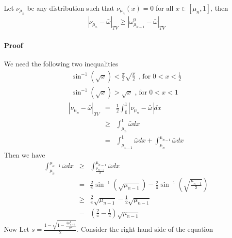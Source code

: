 \begin{lemma}
Let $\nu_{\mu_n}$ be any distribution such that $\nu_{\mu_n}(x)=0$ for all $x\in[\mu_n,1]$, then
\begin{eqnarray}
     |\nu_{\mu_n}-\bar{\omega}|_{TV} \ge |\omega_{\mu_{n-1}}^0 -\bar{\omega}|_{TV}
\end{eqnarray}
\end{lemma}

\paragraph{Proof}
We need the following two inequalities
\begin{eqnarray}
\sin^{-1}(\sqrt{x}) < \frac{\pi}{2}\sqrt{\frac{x}{2}} \mbox{  , for } 0<x<\frac{1}{2}\\
\sin^{-1}(\sqrt{x}) > \sqrt{x}  \mbox{  , for } 0<x<1
\end{eqnarray}
\begin{eqnarray}
|\nu_{\mu_n}-\bar{\omega}|_{TV} &=  & \frac{1}{2} \int_0^1 |\nu_{\mu_n}-\bar{\omega}| dx \nonumber\\
                                &\ge&  \int_{\mu_n}^1 \bar{\omega} dx  \nonumber\\
                                &=  &  \int_{\mu_{n-1}}^1 \bar{\omega} dx +
                                      \int_{\mu_n}^{\mu_{n-1}} \bar{\omega} dx                              
\end{eqnarray}
Then we have
\begin{eqnarray}
 \int_{\mu_n}^{\mu_{n-1}} \bar{\omega} dx 
   &\ge &  \int_{\frac{\mu_{n-1}}{2}}^{\mu_{n-1}} \bar{\omega} dx \nonumber \\
   & =  & \frac{2}{\pi}\sin^{-1}(\sqrt{\mu_{n-1}}) - 
        \frac{2}{\pi}\sin^{-1}\left(\sqrt{\frac{\mu_{n-1}}{2}}\right)  \nonumber\\ 
   &\ge & \frac{2}{\pi}\sqrt{\mu_{n-1}} - \frac{1}{2}\sqrt{\mu_{n-1}}  \nonumber \\ 
   & =  &  \left(\frac{2}{\pi} - \frac{1}{2}\right)\sqrt{\mu_{n-1}}
\end{eqnarray}
Now Let $s = \frac{1- \sqrt{1-\frac{4 \mu_{n-1}^2}{\pi^2}}}{2}$. Consider the right hand side of the equation

